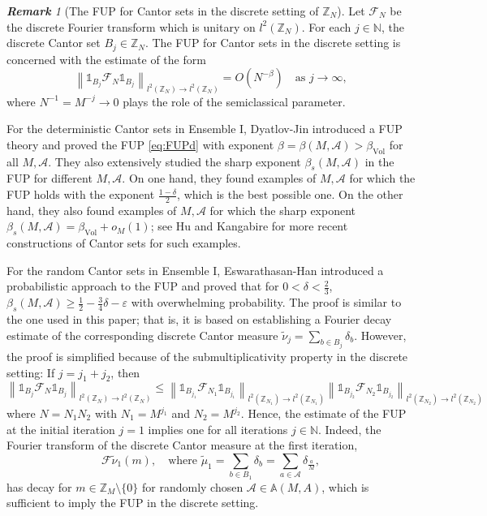 \documentclass[12pt,reqno]{amsart}
\newcommand\Ab{\mathbb{A}}
\newcommand\Ac{\mathcal{A}}
\newcommand\Char{\mathds{1}}
\newcommand\Fc{\mathcal{F}}
\newcommand\N{\mathbb{N}}
\newcommand\Vol{\mathrm{Vol}}
\newcommand\ve{\varepsilon}
\newcommand\Z{\mathbb{Z}}
\theoremstyle{plain}
\theoremstyle{remark}
\newtheorem*{rmk}{\textbf{Remark}}
\numberwithin{equation}{section}
\begin{document}
\begin{rmk}[The FUP for Cantor sets in the discrete setting of $\Z_N$]
Let $\Fc_N$ be the discrete Fourier transform which is unitary on $l^2(\Z_N)$. For each $j\in\N$, the discrete Cantor set $B_j\in\Z_N$. The FUP for Cantor sets in the discrete setting is concerned with the estimate of the form
\begin{equation}\label{eq:FUPd}
\left\|\Char_{B_j}\Fc_N\Char_{B_j}\right\|_{l^2(\Z_N)\to l^2(\Z_N)}=O\left(N^{-\beta}\right)\quad\text{as }j\to\infty,
\end{equation}
where $N^{-1}=M^{-j}\to0$ plays the role of the semiclassical parameter. 

For the deterministic Cantor sets in Ensemble I, Dyatlov-Jin \cite{DJ1} introduced a FUP theory and proved the FUP \eqref{eq:FUPd} with exponent $\beta=\beta(M,\Ac)>\beta_\Vol$ for all $M,\Ac$. They also extensively studied the sharp exponent $\beta_s(M,\Ac)$ in the FUP for different $M,\Ac$. On one hand, they found examples of $M,\Ac$ for which the FUP holds with the exponent $\frac{1-\delta}{2}$, which is the best possible one. On the other hand, they also found examples of $M,\Ac$ for which the sharp exponent $\beta_s(M,\Ac)=\beta_\Vol+o_M(1)$; see Hu \cite{H} and Kangabire \cite{K} for more recent constructions of Cantor sets for such examples.

For the random Cantor sets in Ensemble I, Eswarathasan-Han \cite{EH} introduced a probabilistic approach to the FUP and proved that for $0<\delta<\frac23$, $\beta_s(M,\Ac)\ge\frac12-\frac34\delta-\ve$ with overwhelming probability. The proof is similar to the one used in this paper; that is, it is based on establishing a Fourier decay estimate of the corresponding discrete Cantor measure $\tilde\nu_j=\sum_{b\in B_j}\delta_b$. However, the proof is simplified because of the submultiplicativity property in the discrete setting: If $j=j_1+j_2$, then
$$\left\|\Char_{B_j}\Fc_N\Char_{B_j}\right\|_{l^2(\Z_N)\to l^2(\Z_N)}\le\left\|\Char_{B_{j_1}}\Fc_{N_1}\Char_{B_{j_1}}\right\|_{l^2(\Z_{N_1})\to l^2(\Z_{N_1})}\left\|\Char_{B_{j_2}}\Fc_{N_2}\Char_{B_{j_2}}\right\|_{l^2(\Z_{N_2})\to l^2(\Z_{N_2})}$$
where $N=N_1N_2$ with $N_1=M^{j_1}$ and $N_2=M^{j_2}$. Hence, the estimate of the FUP at the initial iteration $j=1$ implies one for all iterations $j\in\N$. Indeed, the Fourier transform of the discrete Cantor measure at the first iteration,
$$\Fc\tilde\nu_1(m),\quad\text{where }\tilde\mu_1=\sum_{b\in B_1}\delta_b=\sum_{a\in\Ac}\delta_{\frac aM},$$ 
has decay for $m\in\Z_M\setminus\{0\}$ for randomly chosen $\Ac\in\Ab(M,A)$, which is sufficient to imply the FUP in the discrete setting.


\end{rmk}
\end{document}
